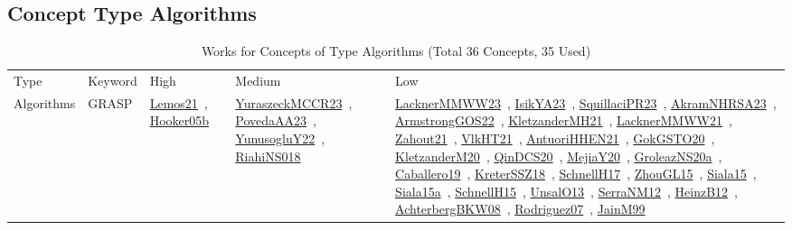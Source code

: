 \clearpage
\subsection{Concept Type Algorithms}
\label{sec:Algorithms}
\label{Algorithms}
{\scriptsize
\begin{longtable}{lp{3cm}>{\raggedright\arraybackslash}p{6cm}>{\raggedright\arraybackslash}p{6cm}>{\raggedright\arraybackslash}p{8cm}}
\rowcolor{white}\caption{Works for Concepts of Type Algorithms (Total 36 Concepts, 35 Used)}\\ \toprule
\rowcolor{white}Type & Keyword & High & Medium & Low\\ \midrule\endhead
\bottomrule
\endfoot
\index{GRASP}\index{Algorithms!GRASP}Algorithms & GRASP & \href{../works/Lemos21.pdf}{Lemos21}~\cite{Lemos21}, \href{../works/Hooker05b.pdf}{Hooker05b}~\cite{Hooker05b} & \href{../works/YuraszeckMCCR23.pdf}{YuraszeckMCCR23}~\cite{YuraszeckMCCR23}, \href{../works/PovedaAA23.pdf}{PovedaAA23}~\cite{PovedaAA23}, \href{../works/YunusogluY22.pdf}{YunusogluY22}~\cite{YunusogluY22}, \href{../works/RiahiNS018.pdf}{RiahiNS018}~\cite{RiahiNS018} & \href{../works/LacknerMMWW23.pdf}{LacknerMMWW23}~\cite{LacknerMMWW23}, \href{../works/IsikYA23.pdf}{IsikYA23}~\cite{IsikYA23}, \href{../works/SquillaciPR23.pdf}{SquillaciPR23}~\cite{SquillaciPR23}, \href{../works/AkramNHRSA23.pdf}{AkramNHRSA23}~\cite{AkramNHRSA23}, \href{../works/ArmstrongGOS22.pdf}{ArmstrongGOS22}~\cite{ArmstrongGOS22}, \href{../works/KletzanderMH21.pdf}{KletzanderMH21}~\cite{KletzanderMH21}, \href{../works/LacknerMMWW21.pdf}{LacknerMMWW21}~\cite{LacknerMMWW21}, \href{../works/Zahout21.pdf}{Zahout21}~\cite{Zahout21}, \href{../works/VlkHT21.pdf}{VlkHT21}~\cite{VlkHT21}, \href{../works/AntuoriHHEN21.pdf}{AntuoriHHEN21}~\cite{AntuoriHHEN21}, \href{../works/GokGSTO20.pdf}{GokGSTO20}~\cite{GokGSTO20}, \href{../works/KletzanderM20.pdf}{KletzanderM20}~\cite{KletzanderM20}, \href{../works/QinDCS20.pdf}{QinDCS20}~\cite{QinDCS20}, \href{../works/MejiaY20.pdf}{MejiaY20}~\cite{MejiaY20}, \href{../works/GroleazNS20a.pdf}{GroleazNS20a}~\cite{GroleazNS20a}, \href{../works/Caballero19.pdf}{Caballero19}~\cite{Caballero19}, \href{../works/KreterSSZ18.pdf}{KreterSSZ18}~\cite{KreterSSZ18}, \href{../works/SchnellH17.pdf}{SchnellH17}~\cite{SchnellH17}, \href{../works/ZhouGL15.pdf}{ZhouGL15}~\cite{ZhouGL15}, \href{../works/Siala15.pdf}{Siala15}~\cite{Siala15}, \href{../works/Siala15a.pdf}{Siala15a}~\cite{Siala15a}, \href{../works/SchnellH15.pdf}{SchnellH15}~\cite{SchnellH15}, \href{../works/UnsalO13.pdf}{UnsalO13}~\cite{UnsalO13}, \href{../works/SerraNM12.pdf}{SerraNM12}~\cite{SerraNM12}, \href{../works/HeinzB12.pdf}{HeinzB12}~\cite{HeinzB12}, \href{../works/AchterbergBKW08.pdf}{AchterbergBKW08}~\cite{AchterbergBKW08}, \href{../works/Rodriguez07.pdf}{Rodriguez07}~\cite{Rodriguez07}, \href{../works/JainM99.pdf}{JainM99}~\cite{JainM99}\\

\end{longtable}}
